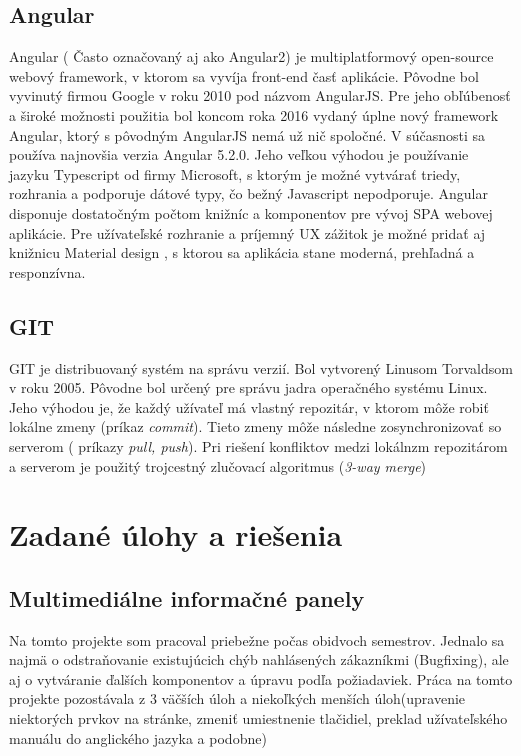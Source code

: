 \documentclass[11pt, oneside]{report}
\begin{document}
\section{Angular}
Angular\cite{angular} ( Často označovaný aj ako Angular2) je multiplatformový  open-source webový framework, v ktorom sa vyvíja front-end časť aplikácie. Pôvodne bol vyvinutý firmou Google v roku 2010 pod názvom AngularJS. Pre jeho obľúbenosť a široké  možnosti použitia bol koncom roka 2016 vydaný úplne nový framework Angular, ktorý s pôvodným AngularJS nemá už nič spoločné. V súčasnosti sa používa najnovšia verzia Angular 5.2.0.
Jeho veľkou výhodou je používanie jazyku Typescript od firmy Microsoft,  s ktorým je možné vytvárať triedy, rozhrania a podporuje dátové typy, čo bežný Javascript nepodporuje. Angular disponuje dostatočným počtom knižníc a komponentov pre vývoj  SPA webovej aplikácie. Pre užívateľské rozhranie a príjemný UX zážitok je možné pridať aj knižnicu Material design \cite{material}, s ktorou  sa aplikácia stane moderná, prehľadná a responzívna.

\section{GIT}
GIT\cite{git} je distribuovaný systém na správu verzií. Bol vytvorený Linusom Torvaldsom v roku 2005. Pôvodne bol určený pre správu jadra operačného systému Linux. Jeho výhodou je, že každý užívateľ má vlastný repozitár, v ktorom môže robiť lokálne zmeny (príkaz \textit{commit}). Tieto zmeny môže následne zosynchronizovať  so serverom ( príkazy \textit{ pull, push}). Pri riešení konfliktov medzi lokálnzm repozitárom a serverom je použitý trojcestný zlučovací algoritmus (\textit{3-way merge}) 

\chapter{Zadané úlohy a riešenia}
\section{Multimediálne informačné panely}
Na tomto projekte som pracoval  priebežne počas  obidvoch semestrov. Jednalo sa najmä o  odstraňovanie existujúcich chýb nahlásených zákazníkmi (Bugfixing), ale aj o vytváranie ďalších komponentov a úpravu podľa požiadaviek. Práca na tomto projekte pozostávala z 3 väčších úloh  a  niekoľkých menších úloh(upravenie niektorých prvkov na stránke, zmeniť umiestnenie tlačidiel, preklad užívateľského manuálu do anglického jazyka a podobne)
\end{document}
